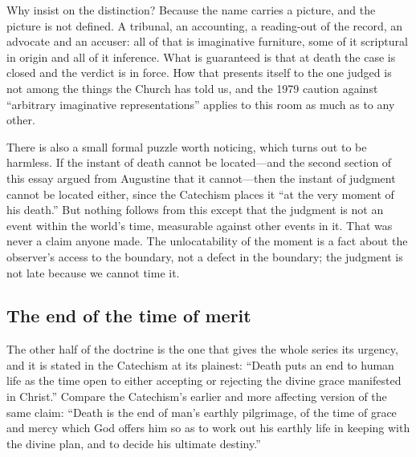 Why insist on the distinction? Because the name carries a picture, and the picture is not defined. A tribunal, an accounting, a reading-out of the record, an advocate and an accuser: all of that is imaginative furniture, some of it scriptural in origin and all of it inference. What is guaranteed is that at death the case is closed and the verdict is in force. How that presents itself to the one judged is not among the things the Church has told us, and the 1979 caution against ``arbitrary imaginative representations'' applies to this room as much as to any other.

There is also a small formal puzzle worth noticing, which turns out to be harmless. If the instant of death cannot be located---and the second section of this essay argued from Augustine that it cannot---then the instant of judgment cannot be located either, since the Catechism places it ``at the very moment of his death.'' But nothing follows from this except that the judgment is not an event within the world's time, measurable against other events in it. That was never a claim anyone made. The unlocatability of the moment is a fact about the observer's access to the boundary, not a defect in the boundary; the judgment is not late because we cannot time it.

\subsection{The end of the time of merit}

The other half of the doctrine is the one that gives the whole series its urgency, and it is stated in the Catechism at its plainest: ``Death puts an end to human life as the time open to either accepting or rejecting the divine grace manifested in Christ.'' Compare the Catechism's earlier and more affecting version of the same claim: ``Death is the end of man's earthly pilgrimage, of the time of grace and mercy which God offers him so as to work out his earthly life in keeping with the divine plan, and to decide his ultimate destiny.''

